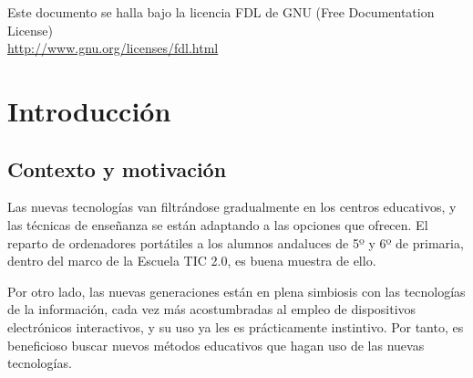 \documentclass[a4paper,11pt]{article}
\begin{document}
\portada


\vspace{0.5cm}

\begin{center}
{\footnotesize Este documento se halla bajo la licencia FDL de GNU (Free Documentation
  License)\\ \url{http://www.gnu.org/licenses/fdl.html} }   
\end{center}



\tableofcontents

\lstset{style=C++}

\setlength{\parindent}{0.3cm}
\setlength{\parskip}{1.2ex plus 0.4ex minus 0.2ex}

\section{Introducción}

\subsection{Contexto y motivación}
Las nuevas tecnologías van filtrándose gradualmente en los centros
educativos, y las técnicas de enseñanza se están adaptando a las
opciones que ofrecen. El reparto de ordenadores portátiles a los
alumnos andaluces de 5º y 6º de primaria, dentro del marco de la
Escuela TIC 2.0, es buena muestra de ello. 

Por otro lado, las nuevas generaciones están en plena simbiosis con las
tecnologías de la información, cada vez más acostumbradas al empleo de
dispositivos electrónicos interactivos, y su uso ya les es prácticamente
instintivo. Por tanto, es beneficioso buscar nuevos métodos educativos que hagan
uso de las nuevas tecnologías.
\end{document}

